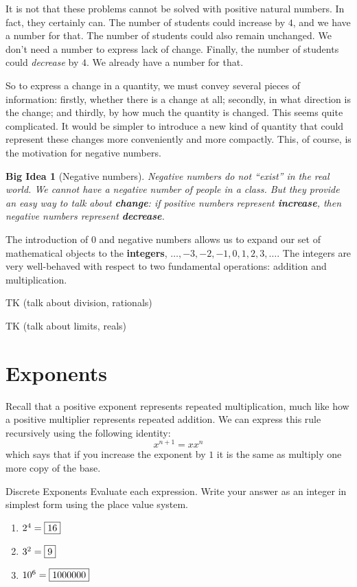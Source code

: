 \documentclass[12pt,a4paper]{report}
\newtheorem{bigidea}{Big Idea}
\begin{document}
It is not that these problems cannot be solved with positive natural numbers. In
fact, they certainly can. The number of students could increase by $4$, and we
have a number for that. The number of students could also remain unchanged. We
don't need a number to express lack of change. Finally, the number of students
could \emph{decrease} by $4$. We already have a number for that.

So to express a change in a quantity, we must convey several pieces of information: firstly,
whether there is a change at all; secondly, in what direction is the change; and thirdly, by
how much the quantity is changed. This seems quite complicated. It would be simpler to
introduce a new kind of quantity that could represent these changes more conveniently and
more compactly. This, of course, is the motivation for negative numbers.

\begin{bigidea}[Negative numbers]
  Negative numbers do not ``exist'' in the real world. We cannot have a negative number of
  people in a class. But they provide an easy way to talk about \textbf{change}: if positive
  numbers represent \textbf{increase}, then negative numbers represent \textbf{decrease}.
\end{bigidea}

The introduction of \(0\) and negative numbers allows us to expand our set of mathematical
objects to the \textbf{integers}, \(\dots, -3, -2, -1, 0, 1, 2, 3, \dots\). The integers are
very well-behaved with respect to two fundamental operations: addition and multiplication.

TK (talk about division, rationals)

TK (talk about limits, reals)

\section{Exponents}

Recall that a positive exponent represents repeated multiplication, much like how a positive
multiplier represents repeated addition. We can express this rule recursively using the
following identity: \[
  x^{n+1} = xx^n
\] which says that if you increase the exponent by \(1\) it is the same as multiply one more
copy of the base.

\begin{problem}{Discrete Exponents}
 Evaluate each expression. Write your answer as an integer in simplest form
 using the place value system.

 \begin{enumerate}[\hspace{.5cm}a.]
  \item \(2^4=\Ans{16}\)
  \item \(3^2=\Ans{9}\)
  \item \(10^6=\Ans{1000000}\)
 \end{enumerate}
\end{problem}
\end{document}
